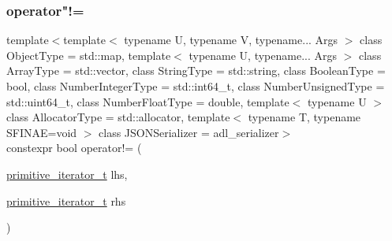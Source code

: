 \subsubsection{\texorpdfstring{operator"!=}{operator!=}}
{\footnotesize\ttfamily template$<$template$<$ typename U, typename V, typename... Args $>$ class Object\+Type = std\+::map, template$<$ typename U, typename... Args $>$ class Array\+Type = std\+::vector, class String\+Type  = std\+::string, class Boolean\+Type  = bool, class Number\+Integer\+Type  = std\+::int64\+\_\+t, class Number\+Unsigned\+Type  = std\+::uint64\+\_\+t, class Number\+Float\+Type  = double, template$<$ typename U $>$ class Allocator\+Type = std\+::allocator, template$<$ typename T, typename S\+F\+I\+N\+A\+E=void $>$ class J\+S\+O\+N\+Serializer = adl\+\_\+serializer$>$ \\
constexpr bool operator!= (\begin{DoxyParamCaption}\item[{\hyperlink{classnlohmann_1_1basic__json_1_1primitive__iterator__t}{primitive\+\_\+iterator\+\_\+t}}]{lhs,  }\item[{\hyperlink{classnlohmann_1_1basic__json_1_1primitive__iterator__t}{primitive\+\_\+iterator\+\_\+t}}]{rhs }\end{DoxyParamCaption})\hspace{0.3cm}{\ttfamily [friend]}}

\mbox{\label{classnlohmann_1_1basic__json_1_1primitive__iterator__t_ac6d902d6ec9a02dabed5452d3ae78f7e}} 
